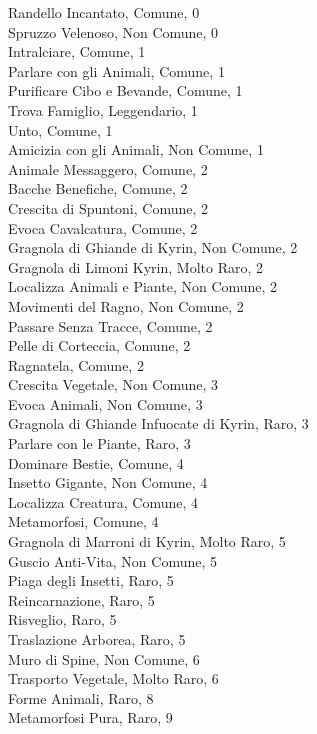 \begin{multicols}{3}
Randello Incantato, Comune, 0\\
Spruzzo Velenoso, Non Comune, 0\\
Intralciare, Comune, 1\\
Parlare con gli Animali, Comune, 1\\
Purificare Cibo e Bevande, Comune, 1\\
Trova Famiglio, Leggendario, 1\\
Unto, Comune, 1\\
Amicizia con gli Animali, Non Comune, 1\\
Animale Messaggero, Comune, 2\\
Bacche Benefiche, Comune, 2\\
Crescita di Spuntoni, Comune, 2\\
Evoca Cavalcatura, Comune, 2\\
Gragnola di Ghiande di Kyrin, Non Comune, 2\\
Gragnola di Limoni Kyrin, Molto Raro, 2\\
Localizza Animali e Piante, Non Comune, 2\\
Movimenti del Ragno, Non Comune, 2\\
Passare Senza Tracce, Comune, 2\\
Pelle di Corteccia, Comune, 2\\
Ragnatela, Comune, 2\\
Crescita Vegetale, Non Comune, 3\\
Evoca Animali, Non Comune, 3\\
Gragnola di Ghiande Infuocate di Kyrin, Raro, 3\\
Parlare con le Piante, Raro, 3\\
Dominare Bestie, Comune, 4\\
Insetto Gigante, Non Comune, 4\\
Localizza Creatura, Comune, 4\\
Metamorfosi, Comune, 4\\
Gragnola di Marroni di Kyrin, Molto Raro, 5\\
Guscio Anti-Vita, Non Comune, 5\\
Piaga degli Insetti, Raro, 5\\
Reincarnazione, Raro, 5\\
Risveglio, Raro, 5\\
Traslazione Arborea, Raro, 5\\
Muro di Spine, Non Comune, 6\\
Trasporto Vegetale, Molto Raro, 6\\
Forme Animali, Raro, 8\\
Metamorfosi Pura, Raro, 9\\



\end{multicols}
